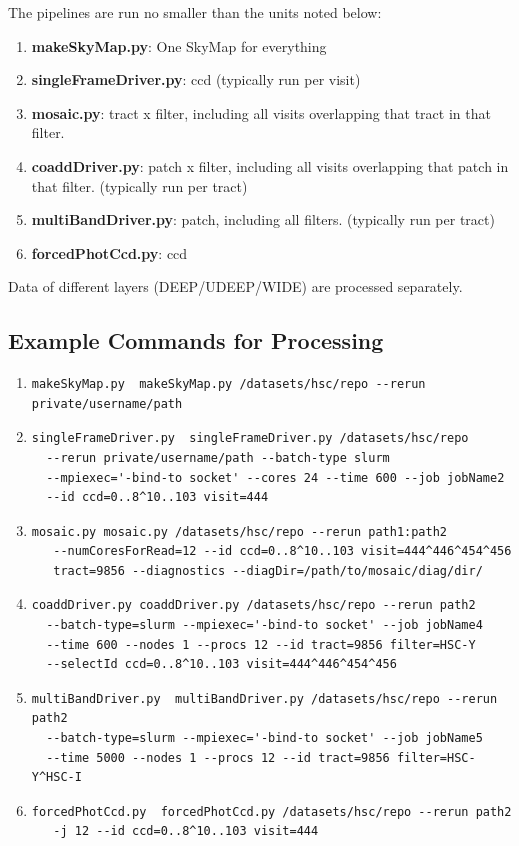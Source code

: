 \documentclass[DM,authoryear,toc]{lsstdoc}
\begin{document}
The pipelines are run no smaller than the units noted below:
\begin{enumerate}
\item
\textbf{makeSkyMap.py}: One SkyMap for everything
\item
\textbf{singleFrameDriver.py}:  ccd (typically run per visit)
\item
\textbf{mosaic.py}: tract x filter, including all visits overlapping that tract in that filter.
\item
\textbf{coaddDriver.py}: patch x filter, including all visits overlapping that patch in that filter. (typically run per tract)
\item
\textbf{multiBandDriver.py}:  patch, including all filters. (typically run per tract)
\item
\textbf{forcedPhotCcd.py}:  ccd
\end{enumerate}
Data of different layers (DEEP/UDEEP/WIDE) are processed separately.

\subsection{Example Commands for Processing}
\begin{enumerate}
\item
\begin{verbatim}
makeSkyMap.py  makeSkyMap.py /datasets/hsc/repo --rerun private/username/path
\end{verbatim}
\item
\begin{verbatim}
singleFrameDriver.py  singleFrameDriver.py /datasets/hsc/repo
  --rerun private/username/path --batch-type slurm
  --mpiexec='-bind-to socket' --cores 24 --time 600 --job jobName2
  --id ccd=0..8^10..103 visit=444
\end{verbatim}
\item
\begin{verbatim}
mosaic.py mosaic.py /datasets/hsc/repo --rerun path1:path2
   --numCoresForRead=12 --id ccd=0..8^10..103 visit=444^446^454^456
   tract=9856 --diagnostics --diagDir=/path/to/mosaic/diag/dir/
\end{verbatim}
\item
\begin{verbatim}
coaddDriver.py coaddDriver.py /datasets/hsc/repo --rerun path2
  --batch-type=slurm --mpiexec='-bind-to socket' --job jobName4
  --time 600 --nodes 1 --procs 12 --id tract=9856 filter=HSC-Y
  --selectId ccd=0..8^10..103 visit=444^446^454^456
\end{verbatim}
\item
\begin{verbatim}
multiBandDriver.py  multiBandDriver.py /datasets/hsc/repo --rerun path2
  --batch-type=slurm --mpiexec='-bind-to socket' --job jobName5
  --time 5000 --nodes 1 --procs 12 --id tract=9856 filter=HSC-Y^HSC-I
\end{verbatim}
\item
\begin{verbatim}
forcedPhotCcd.py  forcedPhotCcd.py /datasets/hsc/repo --rerun path2
   -j 12 --id ccd=0..8^10..103 visit=444
\end{verbatim}
\end{enumerate}
\end{document}
